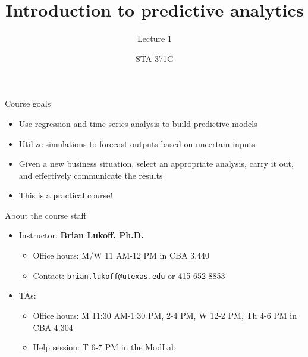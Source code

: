\documentclass{beamer}\usepackage[]{graphicx}\usepackage[]{color}
\title{Introduction to predictive analytics}
\subtitle{Lecture 1}
\author{STA 371G}
\begin{document}
  \frame{\maketitle}



  \begin{darkframes}
    \begin{frame}{Course goals}
      \begin{itemize}
        \item Use regression and time series analysis to build predictive models
        \item Utilize simulations to forecast outputs based on uncertain inputs
        \item Given a new business situation, select an appropriate analysis, carry it out, and effectively communicate the results
        \item \alert{This is a practical course!}
      \end{itemize}
    \end{frame}

    \begin{frame}{About the course staff}
      \begin{itemize}
        \item Instructor: \textbf{Brian Lukoff, Ph.D.}
          \begin{itemize}
            \item Office hours: M/W 11 AM-12 PM in CBA 3.440
            \item Contact: \texttt{brian.lukoff@utexas.edu} or 415-652-8853
          \end{itemize}
        \item TAs:
          \begin{itemize}
            \item Office hours: M 11:30 AM-1:30 PM, 2-4 PM, W 12-2 PM, Th 4-6 PM in CBA 4.304
            \item Help session: T 6-7 PM in the ModLab
          \end{itemize}


\end{itemize}
\end{frame}
\end{darkframes}
\end{document}
